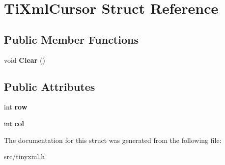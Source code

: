 \hypertarget{structTiXmlCursor}{}\section{Ti\+Xml\+Cursor Struct Reference}
\label{structTiXmlCursor}
\subsection*{Public Member Functions}
\begin{DoxyCompactItemize}
\item 
void {\bfseries Clear} ()\hypertarget{structTiXmlCursor_a1e6fa622b59dafb71b6efe595105dcdd}{}\label{structTiXmlCursor_a1e6fa622b59dafb71b6efe595105dcdd}

\end{DoxyCompactItemize}
\subsection*{Public Attributes}
\begin{DoxyCompactItemize}
\item 
int {\bfseries row}\hypertarget{structTiXmlCursor_a5b54dd949820c2db061e2be41f3effb3}{}\label{structTiXmlCursor_a5b54dd949820c2db061e2be41f3effb3}

\item 
int {\bfseries col}\hypertarget{structTiXmlCursor_a5694d7ed2c4d20109d350c14c417969d}{}\label{structTiXmlCursor_a5694d7ed2c4d20109d350c14c417969d}

\end{DoxyCompactItemize}


The documentation for this struct was generated from the following file\+:\begin{DoxyCompactItemize}
\item 
src/tinyxml.\+h\end{DoxyCompactItemize}
